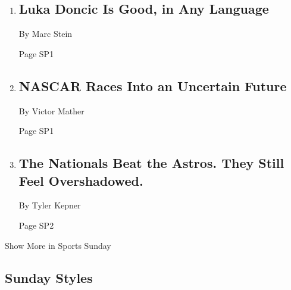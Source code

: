 \begin{enumerate}
\def\labelenumi{\arabic{enumi}.}
\item
  \href{/2020/02/15/sports/basketball/luka-doncic-kobe-all-star.html}{}

  \hypertarget{luka-doncic-is-good-in-any-language-1}{%
  \subsection{Luka Doncic Is Good, in Any
  Language}\label{luka-doncic-is-good-in-any-language-1}}

  By Marc Stein

  Page SP1
\item
  \href{/2020/02/15/sports/autoracing/daytona-500-nascar.html}{}

  \hypertarget{nascar-races-into-an-uncertain-future}{%
  \subsection{NASCAR Races Into an Uncertain
  Future}\label{nascar-races-into-an-uncertain-future}}

  By Victor Mather

  Page SP1
\item
  \href{/2020/02/15/sports/baseball/washington-nationals-astros-spring-training.html}{}

  \hypertarget{the-nationals-beat-the-astros-they-still-feel-overshadowed}{%
  \subsection{The Nationals Beat the Astros. They Still Feel
  Overshadowed.}\label{the-nationals-beat-the-astros-they-still-feel-overshadowed}}

  By Tyler Kepner

  Page SP2
\end{enumerate}

Show More in Sports Sunday

\hypertarget{sunday-styles}{%
\subsection{Sunday Styles}\label{sunday-styles}}

